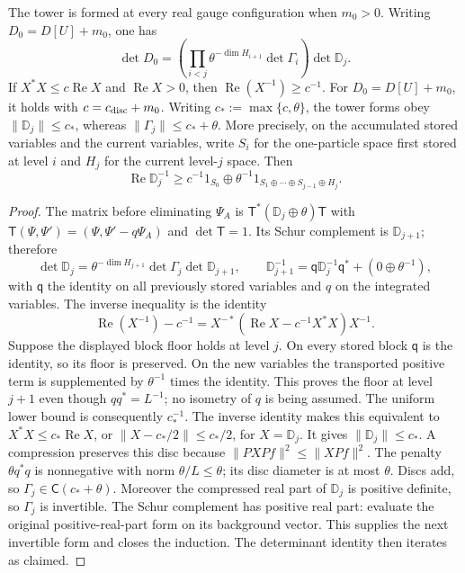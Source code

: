 \documentclass[11pt,letterpaper,reqno]{amsart}
\makeatletter
\theoremstyle{definition}
\newcommand{\ms@minorstart}{%
  \pushQED{\qed}\renewcommand{\qedsymbol}{$\blacksquare$}}
\newenvironment{lemma}[1][]{\ms@minorstart\ms@lemma[#1]}
  {\popQED\endms@lemma}
\theoremstyle{remark}
\makeatother
\begin{document}
\begin{lemma}[Exact factorization]\label{C-397-12}
The tower is formed at every real gauge configuration when $m_0>0$.
Writing $D_0=D[U]+m_0$, one has
\[
 \det D_0=\left(\prod_{i<j}\theta^{-\dim H_{i+1}}
                      \det\Gamma_i\right)\det\mathbb D_j.
\]
If $X^*X\le c\operatorname{Re}X$ and
$\operatorname{Re}X>0$, then $\operatorname{Re}(X^{-1})\ge c^{-1}$.
For $D_0=D[U]+m_0$, it holds with $c=c_{\rm disc}+m_0$.
Writing $c_*:=\max\{c,\theta\}$, the tower forms obey
$\|\mathbb D_j\|\le c_*$, whereas
$\|\Gamma_j\|\le c_*+\theta$.
More precisely, on the accumulated stored variables and the
current variables, write $S_i$ for the one-particle space first
stored at level $i$ and $H_j$ for the current level-$j$ space. Then
\[
 \operatorname{Re}\mathbb D_j^{-1}
 \ge c^{-1}1_{S_0}\oplus
        \theta^{-1}1_{S_1\oplus\cdots\oplus S_{j-1}\oplus H_j}.
\]
\end{lemma}

\begin{proof}
The matrix before eliminating $\Psi_A$ is
$\mathsf T^*(\mathbb D_j\oplus\theta)\mathsf T$ with
$\mathsf T(\Psi,\Psi')=(\Psi,\Psi'-q\Psi_A)$ and
$\det\mathsf T=1$.  Its Schur complement is $\mathbb D_{j+1}$;
therefore
\[
 \det\mathbb D_j=\theta^{-\dim H_{j+1}}
                         \det\Gamma_j\det\mathbb D_{j+1},
 \qquad
 \mathbb D_{j+1}^{-1}=\mathsf q\mathbb D_j^{-1}\mathsf q^*
                                      +(0\oplus\theta^{-1}),
\]
with $\mathsf q$ the identity on all previously stored variables
and $q$ on the integrated variables.  The inverse inequality is the identity
\[
 \operatorname{Re}(X^{-1})-c^{-1}
  =X^{-*}(\operatorname{Re}X-c^{-1}X^*X)X^{-1}.
\]
Suppose the displayed block floor holds at level $j$.
On every stored block $\mathsf q$ is the identity, so its
floor is preserved.  On the new variables the transported
positive term is supplemented by $\theta^{-1}$ times the
identity.  This proves the floor at level $j+1$ even though
$qq^*=L^{-1}$; no isometry of $q$ is being assumed.
The uniform lower bound is consequently $c_*^{-1}$.
The inverse identity makes this equivalent to
$X^*X\le c_*\operatorname{Re}X$, or
$\|X-c_*/2\|\le c_*/2$, for $X=\mathbb D_j$.
It gives $\|\mathbb D_j\|\le c_*$.
A compression preserves this disc because
$\|PXPf\|^2\le\|XPf\|^2$.
The penalty $\theta q^*q$ is nonnegative with norm
$\theta/L\le\theta$; its disc diameter is at most
$\theta$.  Discs add, so
$\Gamma_j\in\mathsf C(c_*+\theta)$.
Moreover the compressed real part of $\mathbb D_j$
is positive definite, so $\Gamma_j$ is invertible.
The Schur complement has positive real part: evaluate the
original positive-real-part form on its background vector.
This supplies the next invertible form and closes the
induction.  The determinant identity then iterates as claimed.
\end{proof}
\end{document}
